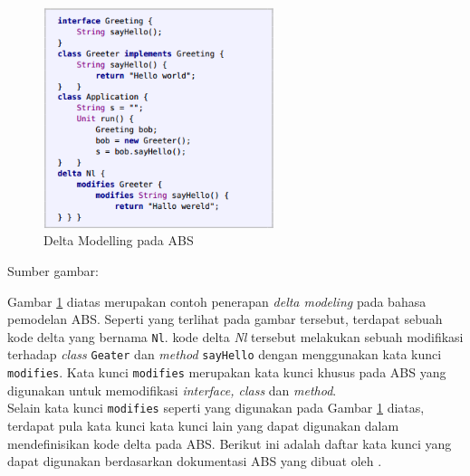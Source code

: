 \begin{figure}
    \centering
    \includegraphics[width=0.6\textwidth]
        {img/delta-modeling-1.png}
    \caption{Delta Modelling pada ABS}
    \label{fig:clarkeDeltaExample}
\end{figure}
\vspace{-0.8cm}

\begin{center}
{\small Sumber gambar: \citep{clarke2012variability}}
\end{center}

Gambar \ref{fig:clarkeDeltaExample} diatas merupakan contoh penerapan \textit{delta modeling} pada bahasa pemodelan ABS. Seperti yang terlihat pada gambar tersebut, terdapat sebuah kode delta yang bernama \texttt{Nl}. kode delta \textit{Nl} tersebut melakukan sebuah modifikasi terhadap \textit{class} \texttt{Geater} dan \textit{method} \texttt{sayHello} dengan menggunakan kata kunci \texttt{modifies}. Kata kunci \texttt{modifies} merupakan kata kunci khusus pada ABS yang digunakan untuk memodifikasi \textit{interface, class} dan \textit{method}.\\

Selain kata kunci \texttt{modifies} seperti yang digunakan pada Gambar \ref{fig:clarkeDeltaExample} diatas, terdapat pula kata kunci kata kunci lain yang dapat digunakan dalam mendefinisikan kode delta pada ABS. Berikut ini adalah daftar kata kunci yang dapat digunakan berdasarkan dokumentasi ABS yang dibuat oleh \cite{absref2013}.


